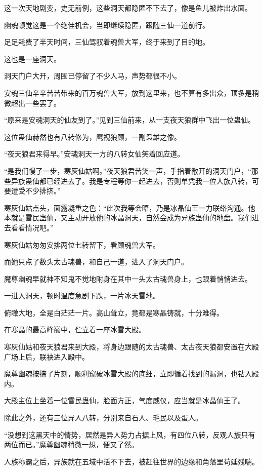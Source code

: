 \begin{this_body}
这一次天地剧变，史无前例，这些洞天都隐匿不下去了，像是鱼儿被炸出水面。

幽魂顿觉这是一个绝佳机会，当即继续隐匿，跟随三仙一道前行。

足足耗费了半天时间，三仙驾驭着魂兽大军，终于来到了目的地。

这也是一座洞天。

洞天门户大开，周围已停留了不少人马，声势都很不小。

安魂三仙辛辛苦苦带来的百万魂兽大军，放到这里来，也不算有多出众，顶多是稍微超出一些罢了。

“原来是安魂洞天的仙友到了。”见到三仙前来，从一支夜天狼群中飞出一位蛊仙。

这位蛊仙赫然也有八转修为，鹰视狼顾，一副枭雄之像。

“夜天狼君来得早。”安魂洞天一方的八转女仙笑着回应道。

“是我们慢了一步，寒灰仙姑啊。”夜天狼君苦笑一声，手指着敞开的洞天门户，“那些异族蛊仙都已经进去了。我是专程等你一起进去，否则单凭我一位人族八转，可要遭受不少排挤。”

寒灰仙姑点头，面露凝重之色：“此次我等会晤，乃是冰晶仙王一力联络沟通。他本就是雪民蛊仙，又主动开放他的冰晶洞天，自然会成为异族蛊仙的地盘。我们进去看看情况吧。”

寒灰仙姑匆匆安排两位七转留下，看顾魂兽大军。

而她只点了数头太古魂兽，和自己一道，进入了洞天门户。

魔尊幽魂早就神不知鬼不觉地附身在其中一头太古魂兽身上，也跟着悄悄进去。

一进入洞天，顿时温度急剧下跌，一片冰天雪地。

俯瞰大地，全是白茫茫一片。高山耸立，竟都是寒晶铸就，十分难得。

在寒晶的最高峰巅中，伫立着一座冰雪大殿。

寒灰仙姑和夜天狼君来到大殿，将身边跟随的太古魂兽、太古夜天狼都安置在大殿广场上后，联袂进入殿中。

魔尊幽魂按捺了片刻，顺利窥破冰雪大殿的底细，立即循着找到的漏洞，也钻入殿内。

大殿主位上坐着一位雪民蛊仙，脸面方正，气度威仪，应当就是冰晶仙王了。

除此之外，还有三位异人八转，分别来自石人、毛民以及蛋人。

“没想到这黑天中的情势，居然是异人势力占据上风，有四位八转，反观人族只有两位而已。”魔尊幽魂稍微一想，便又了然。

人族称霸之后，异族就在五域中活不下去，被赶往世界的边缘和角落里苟延残喘。


\end{this_body}
